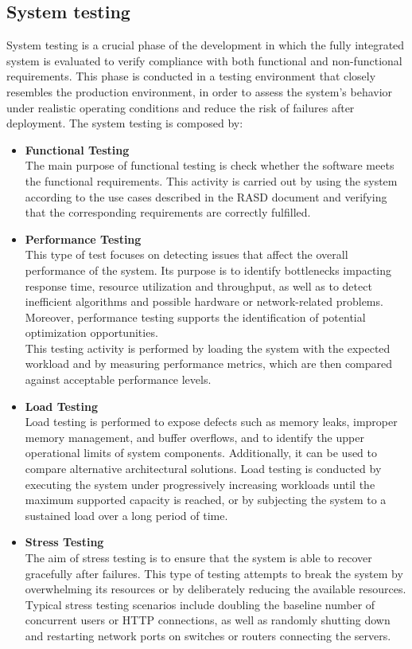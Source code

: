 \subsection{System testing}
System testing is a crucial phase of the development in which the fully integrated system is evaluated to verify compliance with both functional and non-functional requirements. This phase is conducted in a testing environment that closely resembles the production environment, in order to assess the system’s behavior under realistic operating conditions and reduce the risk of failures after deployment.
The system testing is composed by:
\begin{itemize}
    \item \textbf{Functional Testing} \\
    The main purpose of functional testing is check whether the software meets the functional requirements. This activity is carried out by using the system according to the use cases described in the RASD document and verifying that the corresponding requirements are correctly fulfilled.
    \item \textbf{Performance Testing} \\
    This type of test focuses on detecting issues that affect the overall performance of the system. Its purpose is to identify bottlenecks impacting response time, resource utilization and throughput, as well as to detect inefficient algorithms and possible hardware or network-related problems. Moreover, performance testing supports the identification of potential optimization opportunities. \\
    This testing activity is performed by loading the system with the expected workload and by measuring performance metrics, which are then compared against acceptable performance levels.
    \item \textbf{Load Testing}\\
    Load testing is performed to expose defects such as memory leaks, improper memory management, and buffer overflows, and to identify the upper operational limits of system components. Additionally, it can be used to compare alternative architectural solutions. Load testing is conducted by executing the system under progressively increasing workloads until the maximum supported capacity is reached, or by subjecting the system to a sustained load over a long period of time.
    \item \textbf{Stress Testing}\\
    The aim of stress testing is to ensure that the system is able to recover gracefully after failures. This type of testing attempts to break the system by overwhelming its resources or by deliberately reducing the available resources. Typical stress testing scenarios include doubling the baseline number of concurrent users or HTTP connections, as well as randomly shutting down and restarting network ports on switches or routers connecting the servers. 
\end{itemize}
